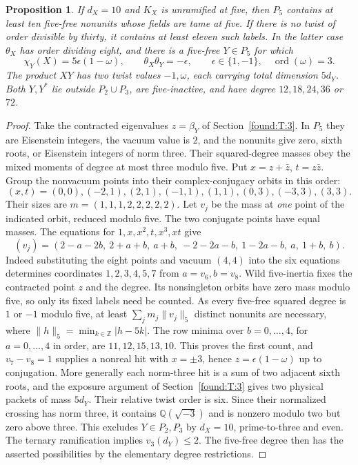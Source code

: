 \documentclass[11pt,a4paper]{article}
\numberwithin{equation}{section}
\newtheorem{proposition}[theorem]{Proposition}
\theoremstyle{remark}
\newcommand{\ZZ}{\mathbb Z}
\newcommand{\QQ}{\mathbb Q}
\begin{document}
\begin{proposition}\label{por:pr:ten-rows}
If $d_X=10$ and $K_X$ is unramified at five, then $P_5$ contains at least ten five-free nonunits whose fields are tame at five. If there is no twist of order divisible by thirty, it contains at least eleven such labels. In the latter case $\theta_X$ has order dividing eight, and there is a five-free $Y\in P_5$ for which
\[
 \chi_Y(X)=5\epsilon(1-\omega),\qquad \theta_X\theta_Y=-\epsilon,
 \qquad \epsilon\in\{1,-1\},\quad \operatorname{ord}(\omega)=3.
\]
The product $XY$ has two twist values $-1,\omega$, each carrying total dimension $5d_Y$. Both $Y,Y^*$ lie outside $P_2\cup P_3$, are five-inactive, and have degree $12,18,24,36$ or $72$.
\end{proposition}
\begin{proof}
Take the contracted eigenvalues $z=\beta_Y$ of Section~\ref{found:T:3}. In $P_5$ they are Eisenstein integers, the vacuum value is $2$, and the nonunits give zero, sixth roots, or Eisenstein integers of norm three. Their squared-degree masses obey the mixed moments of degree at most three modulo five. Put $x=z+\bar z$, $t=z\bar z$. Group the nonvacuum points into their complex-conjugacy orbits in this order:
\[
 (x,t)=(0,0),(-2,1),(2,1),(-1,1),(1,1),(0,3),(-3,3),(3,3).
\]
Their sizes are $m=(1,1,1,2,2,2,2,2)$. Let $v_j$ be the mass at \emph{one} point of the indicated orbit, reduced modulo five. The two conjugate points have equal masses. The equations for $1,x,x^2,t,x^3,xt$ give
\[
 (v_j)=(2-a-2b,\ 2+a+b,\ a+b,\ -2-2a-b,\ 1-2a-b,\ a,\ 1+b,\ b).
\]
Indeed substituting the eight points and vacuum $(4,4)$ into the six equations determines coordinates $1,2,3,4,5,7$ from $a=v_6,b=v_8$. Wild five-inertia fixes the contracted point $z$ and the degree. Its nonsingleton orbits have zero mass modulo five, so only its fixed labels need be counted. As every five-free squared degree is $1$ or $-1$ modulo five, at least $\sum_jm_j\|v_j\|_5$ distinct nonunits are necessary, where $\|h\|_5=\min_{k\in\ZZ}|h-5k|$. The row minima over $b=0,\ldots,4$, for $a=0,\ldots,4$ in order, are $11,12,15,13,10$. This proves the first count, and $v_7-v_8=1$ supplies a nonreal hit with $x=\pm3$, hence $z=\epsilon(1-\omega)$ up to conjugation. More generally each norm-three hit is a sum of two adjacent sixth roots, and the exposure argument of Section~\ref{found:T:3} gives two physical packets of mass $5d_Y$. Their relative twist order is six. Since their normalized crossing has norm three, it contains $\QQ(\sqrt{-3})$ and is nonzero modulo two but zero above three. This excludes $Y\in P_2,P_3$ by $d_X=10$, prime-to-three and even. The ternary ramification implies $v_3(d_Y)\le2$. The five-free degree then has the asserted possibilities by the elementary degree restrictions.


\end{proof}
\end{document}
